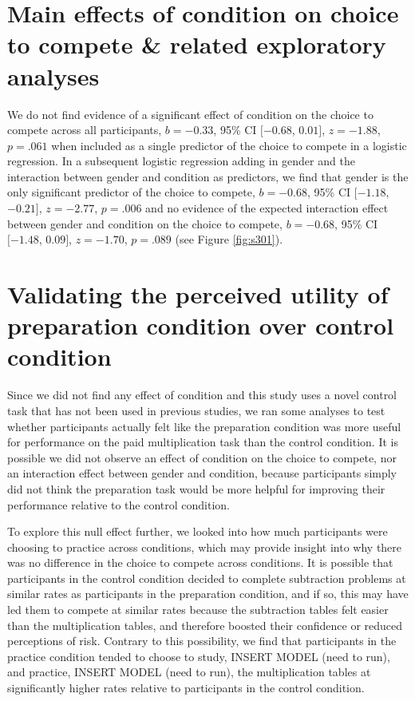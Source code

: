 \documentclass[a4paper,nobind]{templates/ociamthesis}
\begin{document}
\hypertarget{main-effects-of-condition-on-choice-to-compete-related-exploratory-analyses}{%
\section{Main effects of condition on choice to compete \& related exploratory analyses}\label{main-effects-of-condition-on-choice-to-compete-related-exploratory-analyses}}

We do not find evidence of a significant effect of condition on the choice to compete across all participants, \(b = -0.33\), 95\% CI \([-0.68\), \(0.01]\), \(z = -1.88\), \(p = .061\) when included as a single predictor of the choice to compete in a logistic regression. In a subsequent logistic regression adding in gender and the interaction between gender and condition as predictors, we find that gender is the only significant predictor of the choice to compete, \(b = -0.68\), 95\% CI \([-1.18\), \(-0.21]\), \(z = -2.77\), \(p = .006\) and no evidence of the expected interaction effect between gender and condition on the choice to compete, \(b = -0.68\), 95\% CI \([-1.48\), \(0.09]\), \(z = -1.70\), \(p = .089\) (see Figure \ref{fig:s301}).

\hypertarget{validating-the-perceived-utility-of-preparation-condition-over-control-condition}{%
\section{Validating the perceived utility of preparation condition over control condition}\label{validating-the-perceived-utility-of-preparation-condition-over-control-condition}}

Since we did not find any effect of condition and this study uses a novel control task that has not been used in previous studies, we ran some analyses to test whether participants actually felt like the preparation condition was more useful for performance on the paid multiplication task than the control condition. It is possible we did not observe an effect of condition on the choice to compete, nor an interaction effect between gender and condition, because participants simply did not think the preparation task would be more helpful for improving their performance relative to the control condition.

To explore this null effect further, we looked into how much participants were choosing to practice across conditions, which may provide insight into why there was no difference in the choice to compete across conditions. It is possible that participants in the control condition decided to complete subtraction problems at similar rates as participants in the preparation condition, and if so, this may have led them to compete at similar rates because the subtraction tables felt easier than the multiplication tables, and therefore boosted their confidence or reduced perceptions of risk. Contrary to this possibility, we find that participants in the practice condition tended to choose to study, INSERT MODEL (need to run), and practice, INSERT MODEL (need to run), the multiplication tables at significantly higher rates relative to participants in the control condition.
\end{document}
